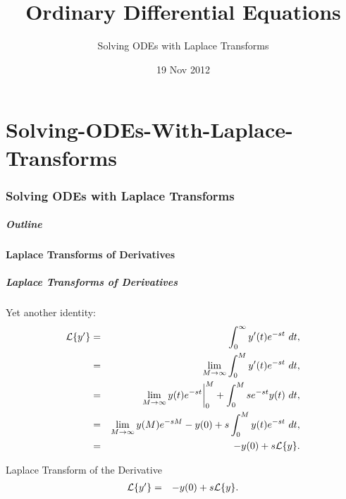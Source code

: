 \part{Solving-ODEs-With-Laplace-Transforms}
\section{Solving ODEs with Laplace Transforms}

\title{Ordinary Differential Equations}
\subtitle{Solving ODEs with Laplace Transforms}
\date{19 Nov 2012}

\begin{frame}
  \titlepage
\end{frame}

\begin{frame}
  \frametitle{Outline}
\end{frame}


\subsection{Laplace Transforms of Derivatives}


\begin{frame}
  \frametitle{Laplace Transforms of Derivatives}

  Yet another identity:
  \begin{eqnarray*}
    \laplace{y'} & = & \int^\infty_0 y'(t) e^{-st} ~ dt, \\
    & = & \lim_{M\rightarrow\infty} \int^M_0 y'(t) e^{-st} ~ dt, \\
    & = & \lim_{M\rightarrow\infty} y(t)e^{-st} \bigg|^M_0 + \int^M_0 s e^{-st} y(t)~dt, \\
    & = & \lim_{M\rightarrow\infty} y(M)e^{-sM} - y(0) + s \int^M_0 y(t) e^{-st} ~dt, \\
    & = & -y(0) + s \laplace{y}.
  \end{eqnarray*}

\end{frame}

\begin{frame}
  \begin{block}{Laplace Transform of the Derivative}
    \begin{eqnarray*}
      \laplace{y'} & = & -y(0) + s \laplace{y}.
    \end{eqnarray*}
  \end{block}
\end{frame}

